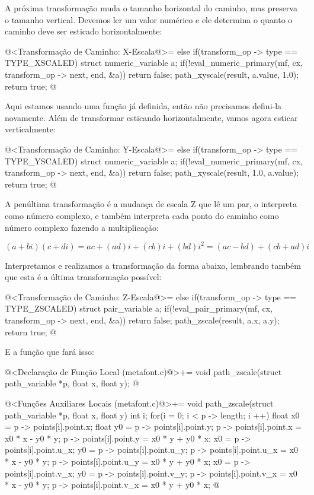 {{{{{{A próxima transformação muda o tamanho horizontal do caminho, mas
preserva o tamanho vertical. Devemos ler um valor numérico e ele
determina o quanto o caminho deve ser esticado horizontalmente:


\iniciocodigo
@<Transformação de Caminho: X-Escala@>=
else if(transform_op -> type == TYPE_XSCALED){
  struct numeric_variable a;
  if(!eval_numeric_primary(mf, cx, transform_op -> next, end, &a))
    return false;
  path_xyscale(result, a.value, 1.0);  
  return true;
}
@
\fimcodigo

Aqui estamos usando uma função já definida, então não precisamos
defini-la novamente. Além de transformar esticando horizontalmente,
vamos agora esticar verticalmente:

\iniciocodigo
@<Transformação de Caminho: Y-Escala@>=
else if(transform_op -> type == TYPE_YSCALED){
  struct numeric_variable a;
  if(!eval_numeric_primary(mf, cx, transform_op -> next, end, &a))
    return false;
  path_xyscale(result, 1.0, a.value);  
  return true;
}
@
\fimcodigo

A penúltima transformação é a mudança de escala Z que lê um par, o
interpreta como número complexo, e também interpreta cada ponto do
caminho como número complexo fazendo a multiplicação:

$$
(a+bi)(c+di) = ac + (ad)i + (cb)i + (bd)i^2 = (ac - bd) + (cb+ad)i
$$

Interpretamos e realizamos a transformação da forma abaixo, lembrando
também que esta é a última transformação possível:

\iniciocodigo
@<Transformação de Caminho: Z-Escala@>=
else if(transform_op -> type == TYPE_ZSCALED){
  struct pair_variable a;
  if(!eval_pair_primary(mf, cx, transform_op -> next, end, &a))
    return false;
  path_zscale(result, a.x, a.y);  
  return true;
}
@
\fimcodigo

E a função que fará isso:

\iniciocodigo
@<Declaração de Função Local (metafont.c)@>+=
void path_zscale(struct path_variable *p, float x, float y);
@
\fimcodigo

\iniciocodigo
@<Funções Auxiliares Locais (metafont.c)@>+=
void path_zscale(struct path_variable *p, float x, float y){
  int i;
  for(i = 0; i < p -> length; i ++){
    float x0 = p -> points[i].point.x;
    float y0 = p -> points[i].point.y;
    p -> points[i].point.x = x0 * x - y0 * y;
    p -> points[i].point.y = x0 * y + y0 * x;
    x0 = p -> points[i].point.u_x;
    y0 = p -> points[i].point.u_y;
    p -> points[i].point.u_x = x0 * x - y0 * y;
    p -> points[i].point.u_y = x0 * y + y0 * x;
    x0 = p -> points[i].point.v_x;
    y0 = p -> points[i].point.v_y;
    p -> points[i].point.v_x = x0 * x - y0 * y;
    p -> points[i].point.v_x = x0 * y + y0 * x;
  }
}
@
\fimcodigo

}}}}}}
